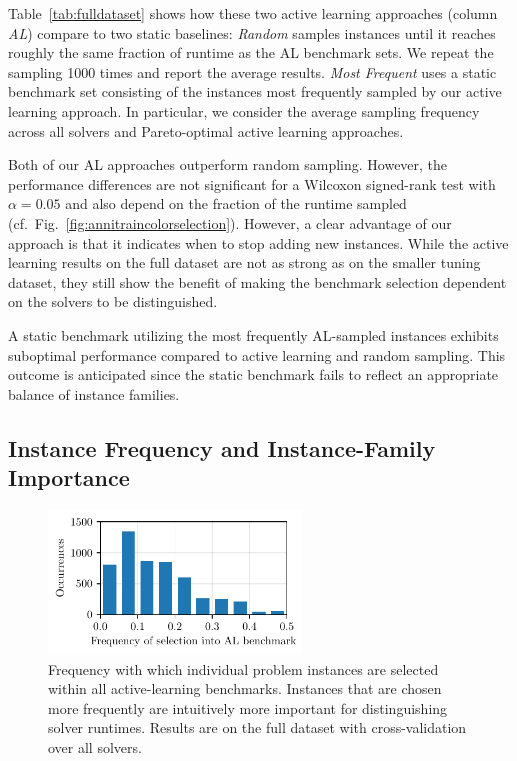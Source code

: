 \documentclass[sn-basic, Numbered]{sn-jnl} %
\begin{document}
Table~\ref{tab:fulldataset} shows how these two active learning approaches (column \emph{AL}) compare to two static baselines:
\emph{Random} samples instances until it reaches roughly the same fraction of runtime as the AL benchmark sets.
We repeat the sampling 1000 times and report the average results.
\emph{Most Frequent} uses a static benchmark set consisting of the instances most frequently sampled by our active learning approach.
In particular, we consider the average sampling frequency across all solvers and Pareto-optimal active learning approaches.

Both of our AL approaches outperform random sampling.
However, the performance differences are not significant for a Wilcoxon signed-rank test with $\alpha = 0.05$ and also depend on the fraction of the runtime sampled (cf.~Fig.~\ref{fig:annitraincolorselection}).
However, a clear advantage of our approach is that it indicates when to stop adding new instances.
While the active learning results on the full dataset are not as strong as on the smaller tuning dataset, they still show the benefit of making the benchmark selection dependent on the solvers to be distinguished.

A static benchmark utilizing the most frequently AL-sampled instances exhibits suboptimal performance compared to active learning and random sampling.
This outcome is anticipated since the static benchmark fails to reflect an appropriate balance of instance families.

\subsection{Instance Frequency and Instance-Family Importance}
\label{sec:eval:instance}

\begin{figure}[tbp]
  \centering
  \includegraphics[width=0.6\textwidth]{plots/instoccs.pdf}
  \caption{Frequency with which individual problem instances are selected within all active-learning benchmarks. Instances that are chosen more frequently are intuitively more important for distinguishing solver runtimes. Results are on the full dataset with cross-validation over all solvers.}
  \label{fig:instoccs}
\end{figure}
\end{document}
